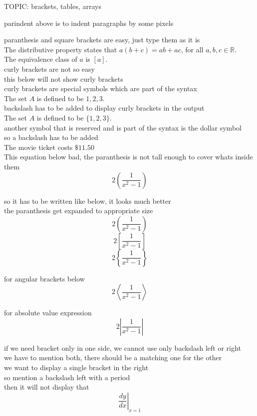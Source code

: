 \documentclass[24pt]{article}
\begin{document}
TOPIC: brackets, tables, arrays

parindent above is to indent paragraphs by some pixels

paranthesis and square brackets are easy, just type them as it is\\

The distributive property states that $a(b+c)=ab+ac$, for all $a, b, c \in \mathbb{R}$.\\[6pt]
The equivalence class of $a$ is $[a]$.\\

curly brackets are not so easy\\

this below will not show curly brackets\\
curly brackets are special symbols which are part of the syntax\\
The set $A$ is defined to be ${1, 2, 3}$.\\[6pt]

backslash has to be added to display curly brackets in the output\\
The set $A$ is defined to be $\{1, 2, 3\}$.\\[6pt]

another symbol that is reserved and is part of the syntax is the dollar symbol\\
so a backslash has to be added\\
The movie ticket costs $\$11.50$\\[6pt]

This equation below bad, the paranthesis is not tall enough to cover whats inside them\\
$$2(\frac{1}{x^2-1})$$

so it has to be written like below, it looks much better\\
the paranthesis get expanded to appropriate size\\
$$2\left(\frac{1}{x^2-1}\right)$$
$$2\left[\frac{1}{x^2-1}\right]$$
$$2\left\{\frac{1}{x^2-1}\right\}$$

for angular brackets below
$$2\left \langle   \frac{1}{x^2-1}\right  \rangle  $$

for absolute value expression
$$2\left  |   \frac{1}{x^2-1}\right  |  $$

if we need bracket only in one side, we cannot use only backslash left or right\\
we have to mention both, there should be a matching one for the other\\
we want to display a single bracket in the right\\
so mention a backslash left with a period\\
then it will not display that\\
$$\left.  \frac{dy}{dx}\right | _{x=1}$$
\end{document}
